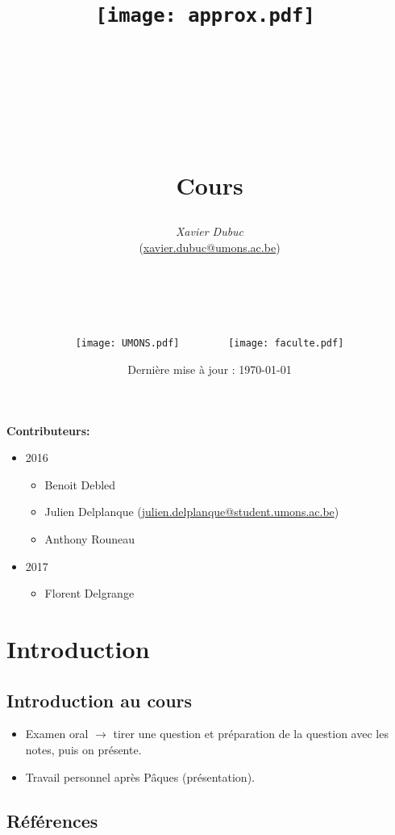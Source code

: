 \documentclass[12pt]{article}
\title{\texttt{[image: approx.pdf]} $ $\\
\hbox{\raisebox{0.4em}{\vrule depth 2pt height 0.2pt width \textwidth}} $ $ \\
\begin{Huge}\maintitlecolor{Algorithmes d'approximation}\end{Huge} \\
$ $ \\
\begin{LARGE}Cours\end{LARGE}}
\author{\textit{Xavier Dubuc} \\(\url{xavier.dubuc@umons.ac.be}) \\$ $\\$ $\\
\hbox{\raisebox{0.4em}{\vrule depth 0.5pt height 0.2pt width 5cm}} \\$ $ \\$ $\\
\texttt{[image: UMONS.pdf]}$\qquad \qquad$
\texttt{[image: faculte.pdf]}}
\date{}
\begin{document}
\maketitle
\begin{center}
	\date{\centering\normalsize{Dernière mise à jour : \today}}
\end{center}
\thispagestyle{empty}
\newpage

\textbf{Contributeurs:}
\renewcommand{\labelitemi}{$\bullet$}

\begin{itemize}
	\item 2016
	\begin{itemize}
		\item Benoit Debled
		\item Julien Delplanque (\url{julien.delplanque@student.umons.ac.be})
		\item Anthony Rouneau
	\end{itemize}
	\item 2017
	\begin{itemize}
		\item Florent Delgrange
	\end{itemize}
\end{itemize}

\newpage


\tableofcontents

\newpage


\section{Introduction}

\subsection*{Introduction au cours}

\begin{itemize}
	\item Examen oral $\rightarrow$ tirer une question et préparation de la question avec les notes, puis on présente.
	\item Travail personnel après Pâques (présentation).
\end{itemize}

\subsection*{Références}
\end{document}
